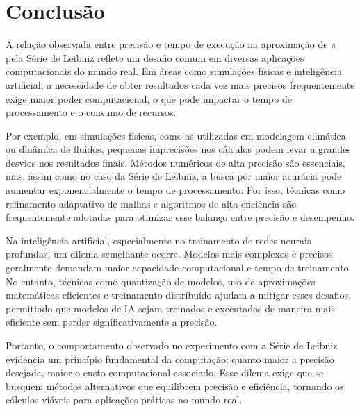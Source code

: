 \documentclass[a4paper, 12pt]{article}
\begin{document}
	\section{Conclusão}
	\hspace{.6cm}A relação observada entre precisão e tempo de execução na aproximação de $\pi$ pela Série de Leibniz reflete um desafio comum em diversas aplicações computacionais do mundo real. Em áreas como simulações físicas e inteligência artificial, a necessidade de obter resultados cada vez mais precisos frequentemente exige maior poder computacional, o que pode impactar o tempo de processamento e o consumo de recursos.
	
	Por exemplo, em simulações físicas, como as utilizadas em modelagem climática ou dinâmica de fluidos, pequenas imprecisões nos cálculos podem levar a grandes desvios nos resultados finais. Métodos numéricos de alta precisão são essenciais, mas, assim como no caso da Série de Leibniz, a busca por maior acurácia pode aumentar exponencialmente o tempo de processamento. Por isso, técnicas como refinamento adaptativo de malhas e algoritmos de alta eficiência são frequentemente adotadas para otimizar esse balanço entre precisão e desempenho.
	
	Na inteligência artificial, especialmente no treinamento de redes neurais profundas, um dilema semelhante ocorre. Modelos mais complexos e precisos geralmente demandam maior capacidade computacional e tempo de treinamento. No entanto, técnicas como quantização de modelos, uso de aproximações matemáticas eficientes e treinamento distribuído ajudam a mitigar esses desafios, permitindo que modelos de IA sejam treinados e executados de maneira mais eficiente sem perder significativamente a precisão.
	
	Portanto, o comportamento observado no experimento com a Série de Leibniz evidencia um princípio fundamental da computação: quanto maior a precisão desejada, maior o custo computacional associado. Esse dilema exige que se busquem métodos alternativos que equilibrem precisão e eficiência, tornando os cálculos viáveis para aplicações práticas no mundo real.
		
	
\end{document}
